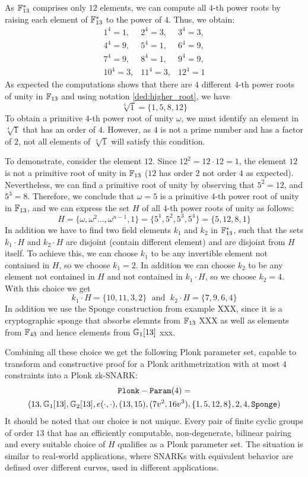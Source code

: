 \begin{example}
As $\mathbb{F}_{13}^*$ comprises only $12$ elements, we can compute all $4$-th power roots by raising each element of $\mathbb{F}_{13}^*$ to the power of $4$. Thus, we obtain:
$$
\begin{array}{lcr}
1^4= 1, &
2^4=3, &
3^4=3, \\
4^4=9, &
5^4=1, &
6^4=9,\\
7^4=9, &
8^4=1, &
9^4=9,\\
10^4=3, &
11^4=3, &
12^4=1
\end{array}
$$
As expected the computations shows that there are $4$ different $4$-th power roots of unity in $\mathbb{F}_{13}$ and using notation \ref{ded:higher_root}, we have
$$
\sqrt[4]{1}= \{1,5,8,12\}
$$
To obtain a primitive $4$-th power root of unity $\omega$, we must identify an element in $\sqrt[4]{1}$ that has an order of $4$. However, as $4$ is not a prime number and has a factor of $2$, not all elements of $\sqrt[4]{1}$ will satisfy this condition.

To demonstrate, consider the element $12$. Since $12^2=12\cdot 12 = 1$, the element $12$ is not a primitive root of unity in $\mathbb{F}_{13}$ ($12$ has order $2$ not order $4$ as expected). Nevertheless, we can find a primitive root of unity by observing that $5^2=12$, and $5^3=8$. Therefore, we conclude that $\omega = 5$ is a primitive $4$-th power root of unity in $\mathbb{F}_{13}$, and we can express the set $H$ of all $4$-th power roots of unity as follows:
$$
H = \{\omega, \omega^2 \ldots, \omega^{n-1}, 1\} = \{5^1,5^2,5^3,5^4\} = \{5,12,8,1\}
$$
In addition we have to find two field elements $k_1$ and $k_2$ in $\mathbb{F}_{13}^*$, such that the sets $k_1\cdot H$ and $k_2\cdot H$ are disjoint (contain different element) and are disjoint from $H$ itself. To achieve this, we can choose $k_1$ to be any invertible element not contained in $H$, so we choose $k_1=2$. In addition we can choose $k_2$ to be any element not contained in $H$ and not contained in $k_1\cdot H$, so we choose $k_2=4$. With this choice we get
$$
k_1\cdot H = \{10, 11, 3, 2\} \;\text{ and }\; k_2\cdot H = \{7, 9, 6, 4\} 
$$ 
In addition we use the Sponge construction from example XXX, since it is a cryptographic sponge that absorbs elemnts from $\mathbb{F}_{13}$ XXX as well as elements from $\mathbb{F}_{43}$ and hence elements from $\mathbb{G}_1[13]$ xxx. 

Combining all these choice we get the following Plonk parameter set, capable to transform and constructive proof for a Plonk arithmetrization with at most $4$ constraints into a Plonk zk-SNARK:
\begin{multline*}
\mathtt{Plonk-Param}(4)=\\(13, \mathbb{G}_1[13], \mathbb{G}_2[13], e(\cdot,\cdot), (13,15),(7v^2,16v^3), \{1,5, 12, 8\}, 2, 4, \texttt{Sponge})
\end{multline*}
It should be noted that our choice is not unique. Every pair of finite cyclic groups of order $13$ that has an efficiently computable, non-degenerate, bilinear pairing and every suitable choice of $H$ qualifies as a Plonk parameter set. The situation is similar to real-world applications, where SNARKs with equivalent behavior are defined over different curves, used in different applications.
\end{example}

